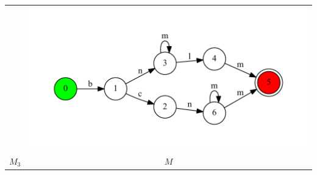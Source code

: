 \documentclass{beamer}
\begin{document}
\begin{frame}[fragile]
\begin{tabular}{c c}
\begin{minipage}{.25\textwidth}
     \end{minipage} 
     &
 	 \begin{minipage}{.65\textwidth} 
     \includegraphics[width=\linewidth]{replace_example}
     \end{minipage} \\     
     $M_3$ & $M$ \\
\end{tabular}
\end{frame}
\end{document}
